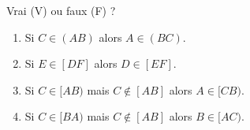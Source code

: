 \begin{exercice*} %
    Vrai (V) ou faux (F) ?
    \begin{enumerate}
       \item Si $C \in (AB)$ alors $A \in (BC)$.
       \item Si $E \in [DF]$ alors $D \in [EF]$.
       \item Si $C \in [AB)$ mais $C \notin [AB]$ alors $A \in [CB)$.
       \item Si $C \in [BA)$ mais $C \notin [AB]$ alors $B \in [AC)$.
    \end{enumerate}
 \end{exercice*}